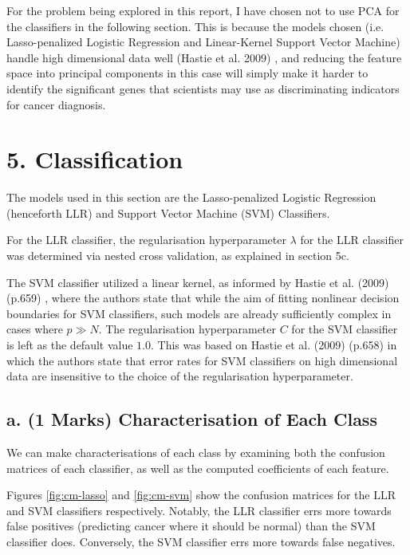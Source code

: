 \documentclass[twocolumn]{article}
\begin{document}
For the problem being explored in this report, I have chosen not to use PCA for the classifiers in the following section. This is because the models chosen (i.e. Lasso-penalized Logistic Regression and Linear-Kernel Support Vector Machine) handle high dimensional data well (Hastie et al. 2009) \cite{HastieTrevor2009EoSL}, and reducing the feature space into principal components in this case will simply make it harder to identify the significant genes that scientists may use as discriminating indicators for cancer diagnosis.

\section{5. Classification}

The models used in this section are the Lasso-penalized Logistic Regression (henceforth LLR) and Support Vector Machine (SVM) Classifiers. 

For the LLR classifier, the regularisation hyperparameter $\lambda$ for the LLR classifier was determined via nested cross validation, as explained in section 5c.

The SVM classifier utilized a linear kernel, as informed by Hastie et al. (2009) (p.659) \cite{HastieTrevor2009EoSL}, where the authors state that while the aim of fitting nonlinear decision boundaries for SVM classifiers, such models are already sufficiently complex in cases where $p \gg N$. The regularisation hyperparameter $C$ for the SVM classifier is left as the default value $1.0$. This was based on Hastie et al. (2009) (p.658) \cite{HastieTrevor2009EoSL} in which the authors state that error rates for SVM classifiers on high dimensional data are insensitive to the choice of the regularisation hyperparameter. 

\subsection{a. (1 Marks) Characterisation of Each Class}

We can make characterisations of each class by examining both the confusion matrices of each classifier, as well as the computed coefficients of each feature. 

Figures \ref{fig:cm-lasso} and \ref{fig:cm-svm} show the confusion matrices for the LLR and SVM classifiers respectively. Notably, the LLR classifier errs more towards false positives (predicting cancer where it should be normal) than the SVM classifier does. Conversely, the SVM classifier errs more towards false negatives. 
\end{document}
